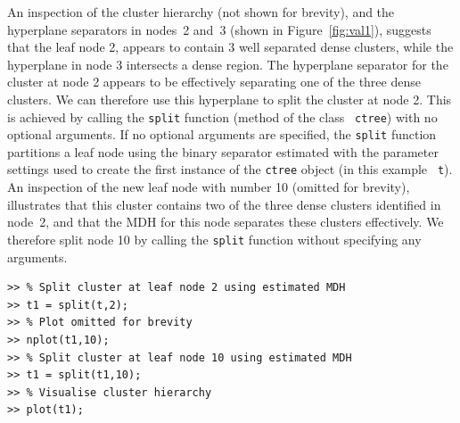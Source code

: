 \documentclass{book}
\begin{document}
\noindent
%
An inspection of the cluster hierarchy (not shown for brevity), and the
hyperplane separators in nodes~2 and~3 (shown in Figure~\ref{fig:val1}),
suggests that the leaf node 2, appears to contain 3 well separated dense
clusters, while the hyperplane in node 3 intersects a dense region.
%
The hyperplane separator for the cluster at node 2 appears to be effectively
separating one of the three dense clusters. We can therefore use this
hyperplane to split the cluster at node 2. 
%
This is achieved by calling the {\tt split} function (method of the class {\tt
ctree}) with no optional arguments. 
%
If no optional arguments are specified, the {\tt split} function partitions a
leaf node using the binary separator estimated with the parameter settings used
to create the first instance of the {\tt ctree} object (in this example {\tt
t}).
%
An inspection of the new leaf node with number 10 (omitted for brevity),
illustrates that this cluster contains two of the three dense clusters
identified in node~2, and that the MDH for this node separates these clusters
effectively.
%
We therefore split node 10 by calling the {\tt  split} function without
specifying any arguments.



\begin{lstlisting}
>> % Split cluster at leaf node 2 using estimated MDH
>> t1 = split(t,2);
>> % Plot omitted for brevity
>> nplot(t1,10);
>> % Split cluster at leaf node 10 using estimated MDH
>> t1 = split(t1,10);
>> % Visualise cluster hierarchy
>> plot(t1);
\end{lstlisting}
\end{document}
